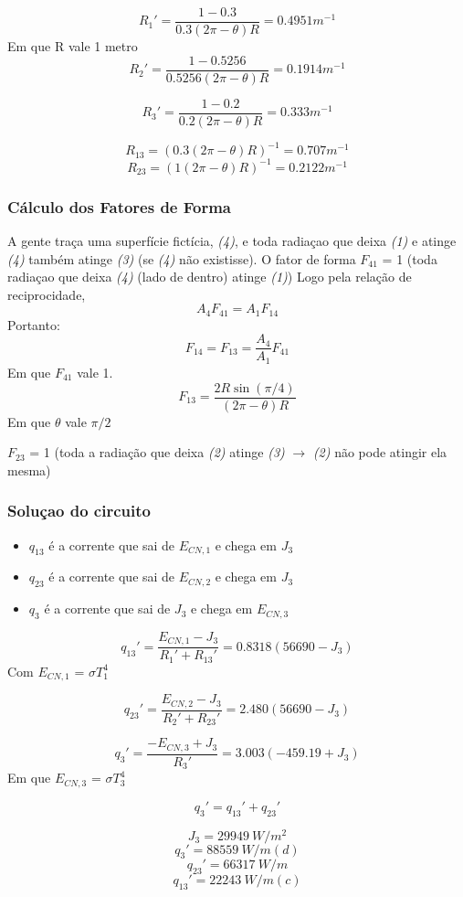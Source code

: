 \documentclass[a4paper, 12pt]{article}
\begin{document}
\[R_{1}' = \frac{1-0.3}{0.3 (2 \pi - \theta )R} = 0.4951 m^{-1}\]
Em que R vale 1 metro
\[R_{2}' = \frac{1-0.5256}{0.5256 (2 \pi - \theta )R} = 0.1914 m^{-1}\]

\[R_{3}' = \frac{1-0.2}{0.2 (2 \pi - \theta )R} = 0.333 m^{-1}\]

\[R_{13} = (0.3 (2 \pi - \theta )R)^{-1} = 0.707 m^{-1}\]
\[R_{23} = (1 (2 \pi - \theta )R)^{-1} = 0.2122 m^{-1} \]

\subsubsection{Cálculo dos Fatores de Forma}
A gente traça uma superfície fictícia, \textit{(4)}, e toda radiaçao que deixa \textit{(1)} e atinge \textit{(4)} também atinge \textit{(3)} (se \textit{(4)} não existisse).
O fator de forma $F_{41}$ = 1 (toda radiaçao que deixa \textit{(4)} (lado de dentro) atinge \textit{(1)})
Logo pela relação de reciprocidade,  
\[A_{4}F_{41} = A_{1}F_{14}\]
Portanto:
\[F_{14} = F_{13} = \frac{A_{4}}{A_{1}} F_{41}\]
Em que $F_{41}$ vale 1. 
\[F_{13} = \frac{2R\sin(\pi / 4) }{(2 \pi - \theta )R}\]
Em que $\theta$ vale $\pi /2$
 
$F_{23}$ = 1  (toda a radiação que deixa \textit{(2)} atinge \textit{(3)} $\rightarrow$ \textit{(2)} não pode atingir ela mesma)

\subsubsection{Soluçao do circuito}


\begin{itemize}
\item $q_{13}$ é a corrente que sai de $E_{CN,1}$ e chega em $J_{3}$
\item $q_{23}$ é a corrente que sai de $E_{CN,2}$ e chega em $J_{3}$
\item $q_{3}$ é a corrente que sai de $J_{3}$ e chega em $E_{CN,3}$
\end{itemize}

\[q_{13}' = \frac{E_{CN,1}-J_{3}}{R_{1}'+R_{13}'} = 0.8318(56690-J_{3})\]
Com $E_{CN,1}$ = $\sigma T_{1}^{4}$

\[q_{23}' = \frac{E_{CN,2}-J_{3}}{R_{2}'+R_{23}'} = 2.480(56690-J_{3})\]

\[q_{3}' = \frac{-E_{CN,3}+J_{3}}{R_{3}'} = 3.003(-459.19+J_{3})\]
Em que $E_{CN,3}$ = $\sigma T_{3}^{4}$

\[q_{3}'=q_{13}'+q_{23}'\]

\[J_{3} = 29949 \ W/m^{2}\]
\[q_{3}' = 88559 \ W/m (d)\]
\[q_{23}' = 66317 \ W/m \]
\[q_{13}' = 22243 \ W/m (c)\]
\end{document}
